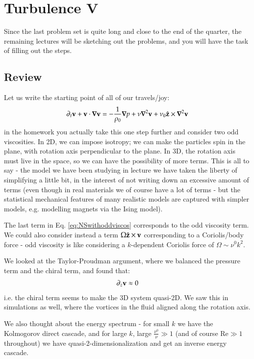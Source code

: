\section{Turbulence V}
Since the last problem set is quite long and close to the end of the quarter, the remaining lectures will be sketching out the problems, and you will have the task of filling out the steps.

\subsection{Review}
Let us write the starting point of all of our travels/joy:
\begin{equation}\label{eq:NSwithoddviscos}
    \p_t \v{v} + \v{v} \cdot \nabla \v{v} = -\frac{1}{\rho_0}\nabla p + \nu \nabla^2\v{v} + \nu_0\zhat \times \nabla^2\v{v}
\end{equation}
in the homework you actually take this one step further and consider two odd viscosities. In 2D, we can impose isotropy; we can make the particles spin in the plane, with rotation axis perpendicular to the plane. In 3D, the rotation axis must live in the space, so we can have the possibility of more terms. This is all to say - the model we have been studying in lecture we have taken the liberty of simplifying a little bit, in the interest of not writing down an excessive amount of terms (even though in real materials we of course have a lot of terms - but the statistical mechanical features of many realistic models are captured with simpler models, e.g. modelling magnets via the Ising model).

The last term in Eq. \eqref{eq:NSwithoddviscos} corresponds to the odd viscosity term. We could also consider instead a term $\Omega\hat{\mathbf{z}} \times \mathbf{v}$ corresponding to a Coriolis/body force - odd viscosity is like considering a $k$-dependent Coriolis force of $\Omega \sim \nu^0 k^2$.

We looked at the Taylor-Proudman argument, where we balanced the pressure term and the chiral term, and found that:
\begin{equation}
    \partial_z \mathbf{v} \approx 0
\end{equation}
i.e. the chiral term seems to make the 3D system quasi-2D. We saw this in simulations as well, where the vortices in the fluid aligned along the rotation axis.

We also thought about the energy spectrum - for small $k$ we have the Kolmogorov direct cascade, and for large $k$, large $\frac{\nu^0}{\nu} \gg 1$ (and of course $\text{Re} \gg 1$ throughout) we have quasi-2-dimensionalization and get an inverse energy cascade.

